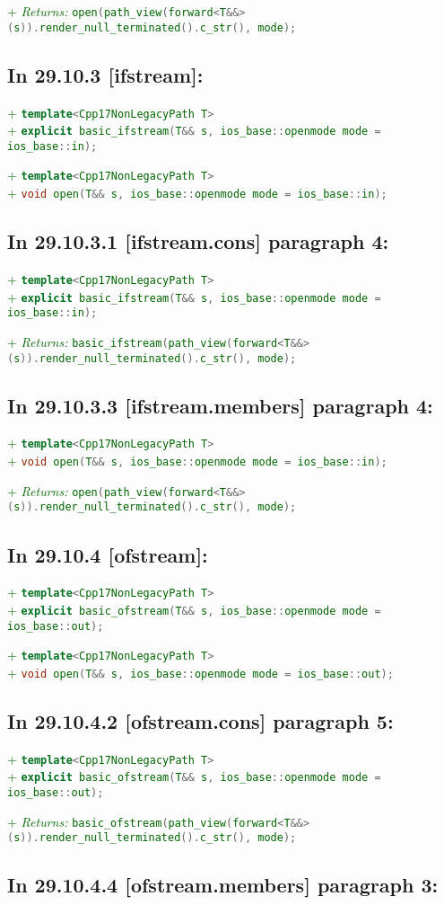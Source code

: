 \documentclass[11pt]{article}
\newcommand{\code}[2][cpp]{\lstinline[language=#1,basicstyle=\small\ttfamily]{#2}}
\newcommand{\desc}[1]{\textit{#1}}
\newcommand{\returns}{\desc{Returns: }}
\newcommand{\tsrefp}[3]{\subsection*{In #2 \textbf{[#1]} paragraph #3:}}
\newcommand{\tsref}[2]{\subsection*{In #2 \textbf{[#1]}:}}
\newcommand{\tsreplace}[3]{\textcolor{red}{\sout{#1}}#2\textcolor{darkgreen}{#3}}
\begin{document}
\tsreplace{}{}{+ \returns \code{open(path_view(forward<T&&>(s)).render_null_terminated().c_str(), mode);}}

\tsref{ifstream}{29.10.3}

\tsreplace{}{}{+ \code{template<Cpp17NonLegacyPath T>}}\\
\tsreplace{}{}{+ \code{explicit basic_ifstream(T&& s,
ios_base::openmode mode = ios_base::in);}}

\tsreplace{}{}{+ \code{template<Cpp17NonLegacyPath T>}}\\
\tsreplace{}{}{+ \code{void open(T&& s, ios_base::openmode mode = ios_base::in);}}

\tsrefp{ifstream.cons}{29.10.3.1}{4}

\tsreplace{}{}{+ \code{template<Cpp17NonLegacyPath T>}}\\
\tsreplace{}{}{+ \code{explicit basic_ifstream(T&& s,
ios_base::openmode mode = ios_base::in);}}

\tsreplace{}{}{+ \returns \code{basic_ifstream(path_view(forward<T&&>(s)).render_null_terminated().c_str(), mode);}}

\tsrefp{ifstream.members}{29.10.3.3}{4}

\tsreplace{}{}{+ \code{template<Cpp17NonLegacyPath T>}}\\
\tsreplace{}{}{+ \code{void open(T&& s, ios_base::openmode mode = ios_base::in);}}

\tsreplace{}{}{+ \returns \code{open(path_view(forward<T&&>(s)).render_null_terminated().c_str(), mode);}}


\tsref{ofstream}{29.10.4}

\tsreplace{}{}{+ \code{template<Cpp17NonLegacyPath T>}}\\
\tsreplace{}{}{+ \code{explicit basic_ofstream(T&& s,
ios_base::openmode mode = ios_base::out);}}

\tsreplace{}{}{+ \code{template<Cpp17NonLegacyPath T>}}\\
\tsreplace{}{}{+ \code{void open(T&& s, ios_base::openmode mode = ios_base::out);}}


\tsrefp{ofstream.cons}{29.10.4.2}{5}

\tsreplace{}{}{+ \code{template<Cpp17NonLegacyPath T>}}\\
\tsreplace{}{}{+ \code{explicit basic_ofstream(T&& s,
ios_base::openmode mode = ios_base::out);}}

\tsreplace{}{}{+ \returns \code{basic_ofstream(path_view(forward<T&&>(s)).render_null_terminated().c_str(), mode);}}

\tsrefp{ofstream.members}{29.10.4.4}{3}
\end{document}
